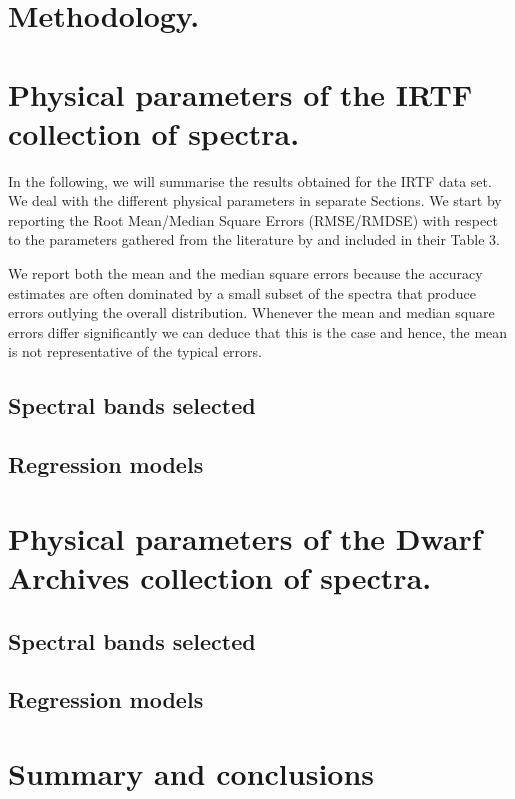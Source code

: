 \documentclass[a4paper,fleqn,usenatbib]{mnras}
\begin{document}
\section{Methodology.}
\label{sec:meth}


\section{Physical parameters of the IRTF collection of spectra.}
\label{sec:irtf}

In the following, we will summarise the results obtained for the IRTF
data set. We deal with the different physical parameters in separate
Sections. We start by reporting the Root Mean/Median Square Errors
(RMSE/RMDSE) with respect to the parameters gathered from the
literature by \cite{cesetti} and included in their Table 3.

We report both the mean and the median square errors because
the accuracy estimates are often dominated by a small subset of the
spectra that produce errors outlying the overall
distribution. Whenever the mean and median square errors differ
significantly we can deduce that this is the case and hence, the
mean is not representative of the typical errors.

\subsection{Spectral bands selected}

\subsection{Regression models}


\section{Physical parameters of the Dwarf Archives collection of spectra.}
\label{sec:ipac}

\subsection{Spectral bands selected}

\subsection{Regression models}


\section{Summary and conclusions}
\label{sec:summary}

\end{document}
